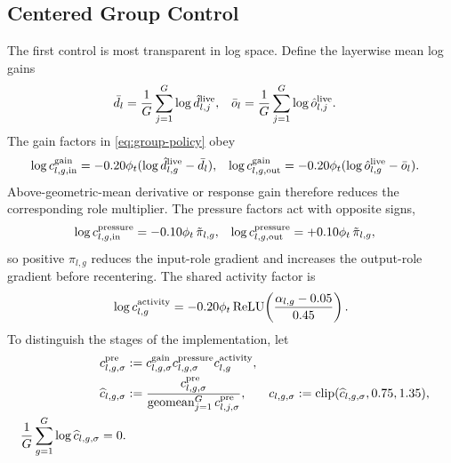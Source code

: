 \documentclass{article}
\newcommand{\clip}{\operatorname{clip}}
\newcommand{\geom}{\operatorname{geomean}}
\newcommand{\relu}{\operatorname{ReLU}}
\begin{document}
\subsection{Centered Group Control}
\label{app:matrixpolicy-role-gate}

The first control is most transparent in log space.  Define the layerwise mean
log gains
\begin{equation}
\begin{aligned}
    \bar d_l
    &=
    \frac{1}{G}\sum_{j=1}^{G}\log \hat d^{\rm live}_{l,j},
    &
    \bar o_l
    &=
    \frac{1}{G}\sum_{j=1}^{G}\log \hat o^{\rm live}_{l,j}.
\end{aligned}
\end{equation}
The gain factors in \eqref{eq:group-policy} obey
\begin{equation}
\begin{aligned}
    \log c^{\rm gain}_{l,g,\mathrm{in}}
    &=
    -0.20\phi_t(\log\hat d^{\rm live}_{l,g}-\bar d_l),
    &
    \log c^{\rm gain}_{l,g,\mathrm{out}}
    &=
    -0.20\phi_t(\log\hat o^{\rm live}_{l,g}-\bar o_l).
\end{aligned}
    \label{eq:appendix-gain-centering}
\end{equation}
Above-geometric-mean derivative or response gain therefore reduces the
corresponding role multiplier.  The pressure factors act with opposite signs,
\begin{equation}
\begin{aligned}
    \log c^{\rm pressure}_{l,g,\mathrm{in}}
    &=
    -0.10\phi_t\,\tilde\pi_{l,g},
    &
    \log c^{\rm pressure}_{l,g,\mathrm{out}}
    &=
    +0.10\phi_t\,\tilde\pi_{l,g},
\end{aligned}
    \label{eq:appendix-pressure-signs}
\end{equation}
so positive $\pi_{l,g}$ reduces the input-role gradient and increases the
output-role gradient before recentering.  The shared activity factor is
\begin{equation}
    \log c^{\rm activity}_{l,g}
    =
    -0.20\phi_t
    \relu\!\left(\frac{\alpha_{l,g}-0.05}{0.45}\right).
    \label{eq:appendix-activity-damping}
\end{equation}
To distinguish the stages of the implementation, let
\begin{equation}
\begin{aligned}
    c^{\rm pre}_{l,g,\sigma}
    &:=
    c^{\rm gain}_{l,g,\sigma}
    c^{\rm pressure}_{l,g,\sigma}
    c^{\rm activity}_{l,g},
    \\
    \widehat c_{l,g,\sigma}
    &:=
    \frac{c^{\rm pre}_{l,g,\sigma}}
         {\geom_{j=1}^{G}c^{\rm pre}_{l,j,\sigma}},
    &
    c_{l,g,\sigma}
    &:=
    \clip(\widehat c_{l,g,\sigma},0.75,1.35),
    \\
    \frac{1}{G}\sum_{g=1}^{G}\log \widehat c_{l,g,\sigma}=0 .
\end{aligned}
    \label{eq:appendix-centered-policy}
\end{equation}
\end{document}
